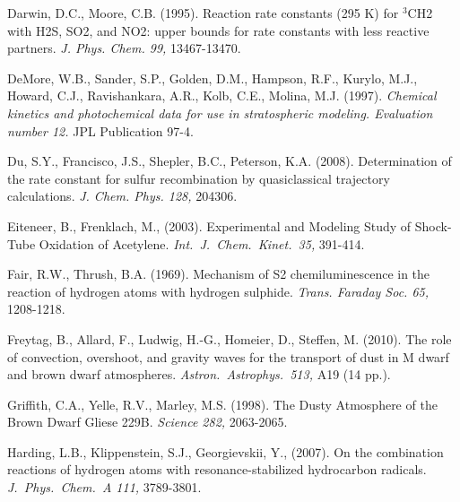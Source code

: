 \documentclass[preprint]{aastex6}
\newcounter{reaction}
\begin{document}
\begin{thebibliography}{00}
Darwin, D.C., Moore, C.B. (1995).  Reaction rate constants (295 K) for $^3$CH2 with H2S, SO2, and NO2: upper bounds for rate constants with less reactive partners. {\em J. Phys. Chem. 99,} 13467-13470.

DeMore, W.B., Sander, S.P., Golden, D.M., Hampson, R.F., Kurylo, M.J., Howard, C.J., Ravishankara, A.R., Kolb, C.E., Molina, M.J. (1997). {\em Chemical kinetics and photochemical data for use in stratospheric modeling. Evaluation number 12.}  JPL Publication 97-4.

 Du, S.Y., Francisco, J.S., Shepler, B.C., Peterson, K.A. (2008). Determination of the rate constant for sulfur recombination by quasiclassical trajectory calculations. {\em J. Chem. Phys. 128,} 204306.
 
Eiteneer, B., Frenklach, M., (2003).
  Experimental and Modeling Study of Shock-Tube Oxidation of Acetylene.
  {\em Int.\ J.\ Chem.\ Kinet.\ 35,} 391-414.
 
Fair, R.W., Thrush, B.A. (1969).  Mechanism of S2 chemiluminescence in the reaction of hydrogen atoms with hydrogen sulphide. { \em Trans. Faraday Soc. 65,} 1208-1218.


Freytag, B., Allard, F., Ludwig, H.-G., Homeier, D., Steffen, M. (2010). 
The role of convection, overshoot, and gravity waves for the transport of dust in M dwarf and brown dwarf atmospheres.
{\em Astron.\ Astrophys.\ 513,} A19 (14 pp.).

Griffith, C.A., Yelle, R.V., Marley, M.S. (1998).
The Dusty Atmosphere of the Brown Dwarf Gliese 229B.
{\em Science 282,} 2063-2065.


Harding, L.B., Klippenstein, S.J., Georgievskii, Y., (2007).
On the combination reactions of hydrogen atoms with resonance-stabilized hydrocarbon radicals.
{\em J.\ Phys.\ Chem.\ A 111,} 3789-3801.


\end{thebibliography}
\end{document}
